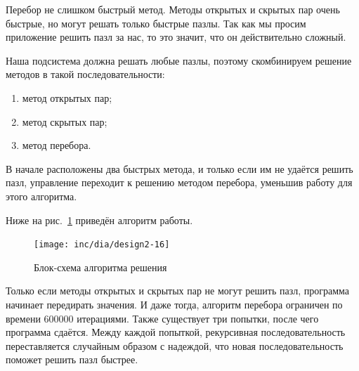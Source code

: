Перебор не слишком быстрый метод. Методы открытых  и скрытых пар очень быстрые, но могут решать только быстрые пазлы. Так как мы просим приложение решить пазл за нас, то это значит, что он действительно сложный. 

Наша подсистема должна решать любые пазлы, поэтому скомбинируем решение методов в такой последовательности:

\begin{enumerate}
  \item метод открытых пар;
  \item метод скрытых пар;
  \item метод перебора.
\end{enumerate}

В начале расположены два быстрых метода, и только если им не удаётся решить пазл, управление переходит к решению методом перебора, уменьшив работу для этого алгоритма. 

Ниже на рис.~\ref{fig:fig23} приведён алгоритм работы. 


\begin{figure}[ht!]
  \centering
  \texttt{[image: inc/dia/design2-16]}
  \caption{Блок-схема алгоритма решения}
  \label{fig:fig23}
\end{figure}

Только если методы открытых и скрытых пар не могут решить пазл, программа начинает передирать значения. И даже тогда, алгоритм перебора ограничен по времени 600000 итерациями. Также существует три попытки, после чего программа сдаётся. Между каждой попыткой, рекурсивная последовательность переставляется случайным образом с надеждой, что новая последовательность поможет решить пазл быстрее. 










